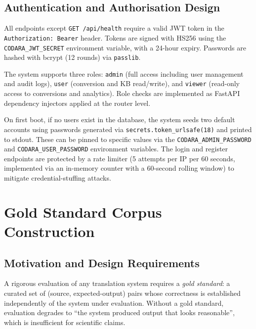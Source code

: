 \subsection{Authentication and Authorisation Design}
\label{subsec:auth-design}

All endpoints except \texttt{GET /api/health} require a valid JWT token in the
\texttt{Authorization: Bearer} header. Tokens are signed with HS256 using the
\texttt{CODARA\_JWT\_SECRET} environment variable, with a 24-hour expiry.
Passwords are hashed with bcrypt (12 rounds) via \texttt{passlib}.

The system supports three roles: \texttt{admin} (full access including user
management and audit logs), \texttt{user} (conversion and KB read/write), and
\texttt{viewer} (read-only access to conversions and analytics). Role checks
are implemented as FastAPI dependency injectors applied at the router level.

On first boot, if no users exist in the database, the system seeds two default
accounts using passwords generated via \texttt{secrets.token\_urlsafe(18)} and
printed to stdout. These can be pinned to specific values via the
\texttt{CODARA\_ADMIN\_PASSWORD} and \texttt{CODARA\_USER\_PASSWORD} environment
variables. The login and register endpoints are protected by a rate limiter
(5 attempts per IP per 60 seconds, implemented via an in-memory counter with
a 60-second rolling window) to mitigate credential-stuffing attacks.

\section{Gold Standard Corpus Construction}
\label{sec:corpus-construction}

\subsection{Motivation and Design Requirements}
\label{subsec:corpus-design}

A rigorous evaluation of any translation system requires a \emph{gold standard}:
a curated set of (source, expected-output) pairs whose correctness is
established independently of the system under evaluation. Without a gold
standard, evaluation degrades to ``the system produced output that looks
reasonable'', which is insufficient for scientific claims.

